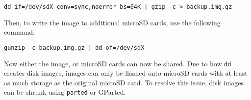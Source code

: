\begin{lstlisting}[caption={Creating an image}, label={lst:backup}]
dd if=/dev/sdX conv=sync,noerror bs=64K | gzip -c > backup.img.gz
\end{lstlisting}

Then, to write the image to additional microSD cards, use the following command:\\

\begin{lstlisting}[caption={Restoring an image}, label={lst:restore}]
gunzip -c backup.img.gz | dd of=/dev/sdX
\end{lstlisting}

Now either the image, or microSD cards can now be shared. Due to how \lstinline{dd} creates disk images, images can only be flashed onto microSD cards with at least as much storage as the original microSD card. To resolve this issue, disk images can be shrunk using \lstinline{parted} or GParted.

\clearpage
